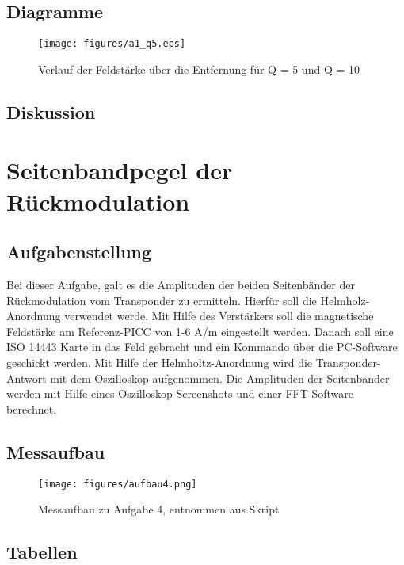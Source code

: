 \documentclass[12pt,a4paper,ngerman]{article}
\begin{document}
\pagebreak
\subsection{Diagramme}
\begin{figure}[H]
\centering
\texttt{[image: figures/a1\_q5.eps]} 
\caption{Verlauf der Feldstärke über die Entfernung für Q = 5 und Q = 10}
\label{fig:1_q5}
\end{figure}

\subsection{Diskussion}

\section{Seitenbandpegel der Rückmodulation}
\subsection{Aufgabenstellung}
Bei dieser Aufgabe, galt es die Amplituden der beiden Seitenbänder der Rückmodulation vom Transponder zu ermitteln. Hierfür soll die Helmholz-Anordnung verwendet werde. Mit Hilfe des Verstärkers soll die magnetische Feldstärke am Referenz-PICC von 1-6 A/m eingestellt werden. Danach soll eine ISO 14443 Karte in das Feld gebracht und ein Kommando über die PC-Software geschickt werden. Mit Hilfe der Helmholtz-Anordnung wird die Transponder-Antwort mit dem Oszilloskop aufgenommen. Die Amplituden der Seitenbänder werden mit Hilfe eines Oszilloskop-Screenshots und einer FFT-Software berechnet. 

\subsection{Messaufbau}

\begin{figure}[H]
\centering
\texttt{[image: figures/aufbau4.png]} 
\caption{Messaufbau zu Aufgabe 4, entnommen aus Skript \cite[S.39 Abbildung 42]{skript}}
\label{fig:aufbau4}
\end{figure}

\subsection{Tabellen}
\end{document}
